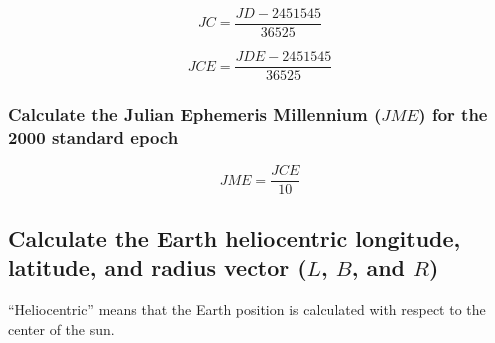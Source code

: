 \documentclass{article}
\begin{document}
\begin{equation}
  \label{eq:jc}
  JC = \frac{JD - 2451545}{36525}
\end{equation}

\begin{equation}
  \label{eq:jce}
  JCE = \frac{JDE - 2451545}{36525}
\end{equation}

\subsubsection{Calculate the Julian Ephemeris Millennium ($JME$) for
  the 2000 standard epoch}

\begin{equation}
  \label{eq:jme}
  JME = \frac{JCE}{10}
\end{equation}

\subsection{Calculate the Earth heliocentric longitude, latitude, and
  radius vector ($L$, $B$, and $R$)}
\label{sec:earth_heliocentric}

\par “Heliocentric” means that the Earth position is calculated with
respect to the center of the sun.
\end{document}
